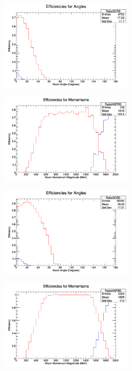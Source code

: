 \documentclass[11pt]{article}
\begin{document}
\begin{figure}[H]
\centering
\includegraphics[width=0.6\textwidth]{ANMCombinedPlotsImages/1-ANMCombinedPlots.png}
\caption{}
\end{figure}

\begin{figure}[H]
\centering
\includegraphics[width=0.6\textwidth]{ANMCombinedPlotsImages/2-ANMCombinedPlots.png}
\caption{}
\end{figure}

\begin{figure}[H]
\centering
\includegraphics[width=0.6\textwidth]{ANMCombinedPlotsImages/3-ANMCombinedPlots.png}
\caption{}
\end{figure}

\begin{figure}[H]
\centering
\includegraphics[width=0.6\textwidth]{ANMCombinedPlotsImages/4-ANMCombinedPlots.png}
\caption{}
\end{figure}
\end{document}
